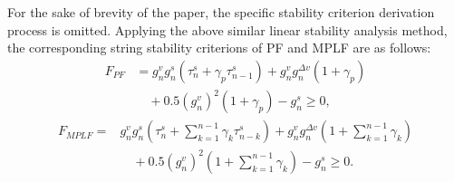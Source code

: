 \documentclass[journal]{IEEEtran}
\begin{document}
For the sake of brevity of the paper, the specific stability criterion derivation process is omitted. Applying the above similar linear stability analysis method, the corresponding string stability criterions of PF and MPLF are as follows:
\begin{equation}
  \begin{aligned}
    F_{PF}
     & = g_{n}^{v} g_{n}^{s}\left(\tau_{n}^{s}\!+\!\gamma_{p} \tau_{n\!-\!1}^{s}\right)\!+\!g_{n}^{v} g_{n}^{\Delta v}\left(1\!+\!\gamma_{p}\right)\! \\
     & \quad +\!0.5\left(g_{n}^{v}\right)^{2}\left(1\!+\!\gamma_{p}\right)\!-\!g_{n}^{s} \geq 0,
  \end{aligned}
  \label{Eq21}
\end{equation}
\begin{equation}
  \begin{aligned}
    F_{MPLF}= & g_{n}^{v} g_{n}^{s}\left(\tau_{n}^{s}\!+\!\sum_{k=1}^{n\!-\!1} \gamma_{k} \tau_{n\!-\!k}^{s}\right)\!+\!g_{n}^{v} g_{n}^{\Delta v}\left(1\!+\!\sum_{k=1}^{n\!-\!1} \gamma_{k}\right) \\
              & \quad\!+\!0.5\left(g_{n}^{v}\right)^{2}\left(1\!+\!\sum_{k=1}^{n\!-\!1} \gamma_{k}\right)\!-\!g_{n}^{s} \geq 0.
  \end{aligned}
  \label{Eq22}
\end{equation}
\end{document}
